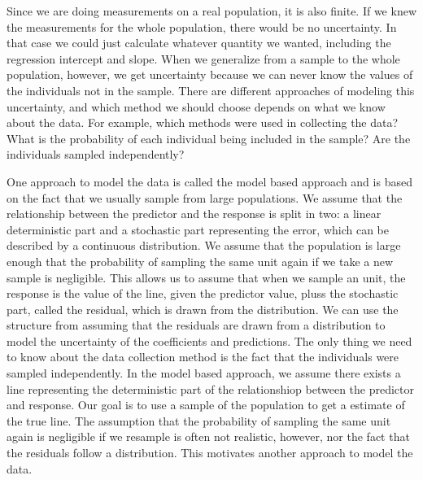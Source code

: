 \documentclass{article}
\begin{document}
Since we are doing measurements on a real population, it is also finite.
If we knew the measurements for the whole population, there
would be no uncertainty. In that case we could just calculate whatever quantity we
wanted, including the regression intercept and slope. When we generalize from a sample to the whole population, however, we get
uncertainty because we can never know the values of the individuals not in the sample. There are different approaches of modeling this uncertainty, and
which method we should choose depends on what we know about the data. For example, which
methods were used in collecting the data?
What is the probability of each
individual being included in the sample? Are the individuals sampled independently? 

One approach to model the data is called the model based approach and is based
on the fact that we usually sample from large populations. We assume that the
relationship between the predictor and the response is split in two: a linear deterministic
part and a stochastic part representing the error, which can be described by a continuous distribution. We assume that the population
is large enough that the probability of sampling the same unit again if we take
a new sample is negligible. This allows us to assume that when we sample an unit, 
the response is the value of the line, given the predictor value, pluss the stochastic
part, called the residual, which is drawn from the distribution. We can use the
structure from assuming that the residuals are drawn from a distribution to
model the uncertainty of the coefficients and predictions. The only thing we need
to know about the data collection method is the fact that the individuals were
sampled independently. In the model based approach, we assume there exists a
line representing the deterministic part of the relationshiop between the
predictor and response. Our goal is to use a sample of the population to get a
estimate of the true line. The assumption that the
probability of sampling the same unit again is negligible if we resample is often not
realistic, however, nor the fact that the residuals follow a
distribution. This motivates another approach to model the data. 


\end{document}
